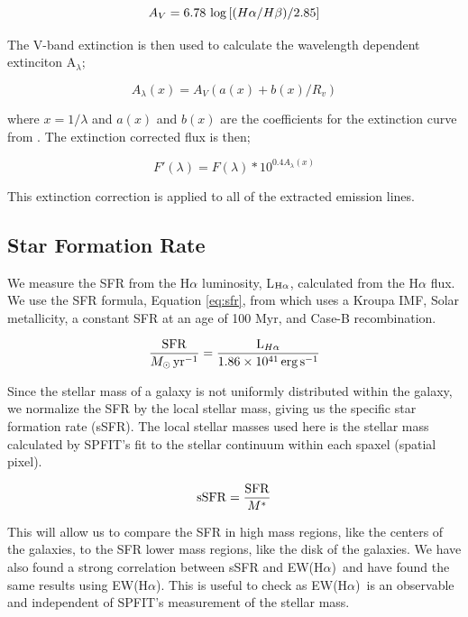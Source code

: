 \documentclass[iop,revtex4,twocolumn,apj,numberedappendix,appendixfloats]{emulateapj}
\newcommand{\ewha}{EW(H$\alpha$)}
\begin{document}
\begin{equation}
A_V = 6.78\ {\rm log} \left[(H\alpha/H\beta)/2.85 \right]
\end{equation}

The V-band extinction is then used to calculate the wavelength dependent extinciton A$_{\lambda}$;

\begin{equation}
A_{\lambda}(x) = A_V \left(a(x) + b(x) / R_v \right)
\end{equation}

where $x = 1/\lambda$ and $a(x)$ and $b(x)$ are the coefficients for the extinction curve from \citet{ODonnell:1994}. The extinction corrected flux is then;

\begin{equation}
F'(\lambda) = F(\lambda) * 10^{0.4 A_{\lambda}(x)}
\end{equation}

This extinction correction is applied to all of the extracted emission lines.

\subsection{Star Formation Rate}

We measure the SFR from the H$\alpha$ luminosity, L$_{{\rm H}\alpha}$, calculated from the H$\alpha$ flux.  We use the SFR formula, Equation \ref{eq:sfr}, from \citet{Murphy:2011} which uses a Kroupa IMF, Solar metallicity, a constant SFR at an age of 100 Myr, and Case-B recombination. 

\begin{equation}\label{eq:sfr}
\frac{\rm{SFR}}{M_{\odot} \, \rm{yr^{-1}}} = \frac{{\rm L}_{H\alpha}}{1.86 \times 10^{41}\, \rm{erg\,s}^{-1}}
\end{equation}

Since the stellar mass of a galaxy is not uniformly distributed within the galaxy, we normalize the SFR by the local stellar mass, giving us the specific star formation rate (sSFR). The local stellar masses used here is the stellar mass calculated by {\sc SPFIT}'s fit to the stellar continuum within each spaxel (spatial pixel).

\begin{equation}
{\rm sSFR} = \frac{\rm SFR}{M^*}
\end{equation}

This will allow us to compare the SFR in high mass regions, like the centers of the galaxies, to the SFR lower mass regions, like the disk of the galaxies. We have also found a strong correlation between sSFR and \ewha\ and have found the same results using \ewha. This is useful to check as \ewha\ is an observable and independent of {\sc SPFIT}'s measurement of the stellar mass. 
\end{document}
